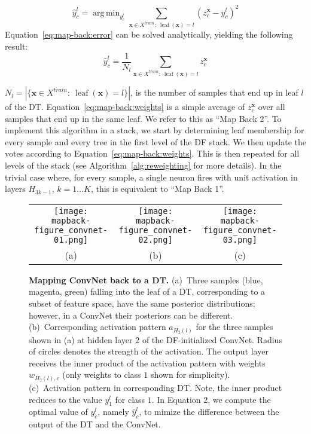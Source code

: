 \documentclass[twocolumn]{svjour3}
\DeclareMathOperator{\leaf}{leaf}
\DeclareMathOperator*{\argmin}{arg\,min}
\begin{document}
\begin{equation}
\hat{y}^l_c = \argmin_{y^l_c} \sum\limits_{\mathbf{x} \in X^{train}: \ \leaf(\mathbf{x})=l} \left( z^{\mathbf{x}}_c - y^l_c \right)^2
\label{eq:map-back:error}
\end{equation}
%
Equation~\ref{eq:map-back:error} can be solved analytically, yielding the following result:
%
\begin{equation}
\hat{y}^l_c = \frac{1}{N_l} \sum\limits_{\mathbf{x} \in X^{train} : \ \leaf(\mathbf{x})=l} z^{\mathbf{x}}_c 
\label{eq:map-back:weights}
\end{equation}

$N_l = |\{{\mathbf{x} \in X^{train}: \ \leaf(\mathbf{x})=l}\}|$, is the number of samples that end up in leaf $l$ of the DT.
Equation~\ref{eq:map-back:weights} is a simple average of $z^{\mathbf{x}}_c$ over all samples that end up in the same leaf.
We refer to this as ``Map Back 2''.
To implement this algorithm in a stack, we start by determining leaf membership for every sample and every tree in the first level of the DF stack. We then update the votes according to Equation~\ref{eq:map-back:weights}.  This is then repeated for all levels of the stack
(see Algorithm~\ref{alg:reweighting} for more details).
In the trivial case where, for every sample, a single neuron fires with unit activation in layers $H_{3k-1}$, $k=1...K$, this is equivalent to ``Map Back 1''.

\begin{figure*}
\begin{center}
\begin{tabular}{ccc}

   \texttt{[image: mapback-figure\_convnet-01.png]} &
   \texttt{[image: mapback-figure\_convnet-02.png]} &
   \texttt{[image: mapback-figure\_convnet-03.png]} \\
				   (a) & (b) & (c) \\
\end{tabular}
\end{center}
   \caption{\textbf{Mapping ConvNet back to a DT. } (a)~Three samples (blue, magenta, green) falling into the leaf of a DT, corresponding to a subset of feature space, have the same posterior distributions; however, in a ConvNet their posteriors can be different. (b)~Corresponding activation pattern $a_{H_2(l)}$ for the three samples shown in (a) at hidden layer $2$ of the DF-initialized ConvNet. Radius of circles denotes the strength of the activation. The output layer receives the inner product of the activation pattern with weights $w_{H_2(l),c}$ (only weights to class $1$ shown for simplicity). (c)~Activation pattern in corresponding DT. Note, the inner product reduces to the value $y^l_1$ for class $1$. In Equation 2, we compute the optimal value of $y^l_c$, namely $\hat{y}^l_c$, to mimize the difference between the output of the DT and the ConvNet.}
\label{fig:map-back}
\end{figure*}
\end{document}
